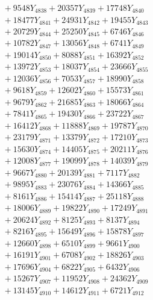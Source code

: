 \documentclass[a4paper,10pt]{article}
\begin{document}
{\begin{align}
&\;  + 9548 Y_{4838} + 20357 Y_{4839} + 17748 Y_{4840} \\[0.3ex]
&\;  + 18477 Y_{4841} + 24931 Y_{4842} + 19455 Y_{4843} \\[0.3ex]
&\;  + 20729 Y_{4844} + 25250 Y_{4845} + 6746 Y_{4846} \\[0.3ex]
&\;  + 10782 Y_{4847} + 13056 Y_{4848} + 6741 Y_{4849} \\[0.3ex]
&\;  + 19014 Y_{4850} + 8088 Y_{4851} + 16392 Y_{4852} \\[0.3ex]
&\;  + 13972 Y_{4853} + 18037 Y_{4854} + 23666 Y_{4855} \\[0.3ex]
&\;  + 12036 Y_{4856} + 7053 Y_{4857} + 18990 Y_{4858} \\[0.5ex]\allowbreak
&\;  + 9618 Y_{4859} + 12602 Y_{4860} + 15573 Y_{4861} \\[0.3ex]
&\;  + 9679 Y_{4862} + 21685 Y_{4863} + 18066 Y_{4864} \\[0.3ex]
&\;  + 7841 Y_{4865} + 19430 Y_{4866} + 23722 Y_{4867} \\[0.3ex]
&\;  + 16412 Y_{4868} + 11888 Y_{4869} + 19787 Y_{4870} \\[0.3ex]
&\;  + 23179 Y_{4871} + 13379 Y_{4872} + 17210 Y_{4873} \\[0.3ex]
&\;  + 15630 Y_{4874} + 14405 Y_{4875} + 20211 Y_{4876} \\[0.3ex]
&\;  + 12008 Y_{4877} + 19099 Y_{4878} + 14039 Y_{4879} \\[0.3ex]
&\;  + 9667 Y_{4880} + 20139 Y_{4881} + 7117 Y_{4882} \\[0.3ex]
&\;  + 9895 Y_{4883} + 23076 Y_{4884} + 14366 Y_{4885} \\[0.3ex]
&\;  + 8161 Y_{4886} + 15414 Y_{4887} + 25118 Y_{4888} \\[0.5ex]\allowbreak
&\;  + 18006 Y_{4889} + 19822 Y_{4890} + 17249 Y_{4891} \\[0.3ex]
&\;  + 20624 Y_{4892} + 8125 Y_{4893} + 8137 Y_{4894} \\[0.3ex]
&\;  + 8216 Y_{4895} + 15649 Y_{4896} + 15878 Y_{4897} \\[0.3ex]
&\;  + 12660 Y_{4898} + 6510 Y_{4899} + 9661 Y_{4900} \\[0.3ex]
&\;  + 16191 Y_{4901} + 6708 Y_{4902} + 18826 Y_{4903} \\[0.3ex]
&\;  + 17696 Y_{4904} + 6822 Y_{4905} + 6432 Y_{4906} \\[0.3ex]
&\;  + 15267 Y_{4907} + 11952 Y_{4908} + 24362 Y_{4909} \\[0.3ex]
&\;  + 13145 Y_{4910} + 14612 Y_{4911} + 6721 Y_{4912} \\[0.3ex]

\end{align}}
\end{document}
